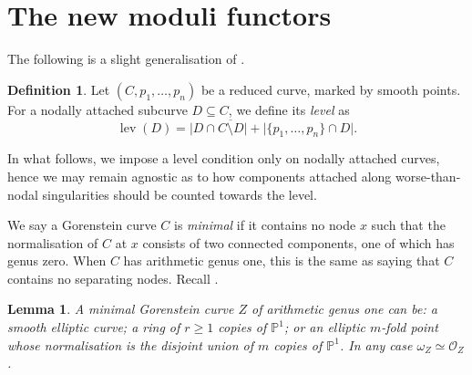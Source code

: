 \documentclass[11pt]{amsart}
\newcommand{\PP}{\mathbb P}
\newcommand{\OO}{\mathcal O}
\newcommand{\lev}{\operatorname{lev}}
\theoremstyle{plain}
\newtheorem{lem}[thm]{Lemma}
\theoremstyle{definition}
\newtheorem{dfn}[thm]{Definition}
\begin{document}
\section{The new moduli functors}\label{sec:stability}
The following is a slight generalisation of \cite[Definition 3.4]{SMY1}.
\begin{dfn}
 Let $(C,p_1,\ldots,p_n)$ be a reduced curve, marked by smooth points. For a nodally attached subcurve $D\subseteq C$, we define its \emph{level} as \[ \lev(D)=\lvert D\cap\overline{C\setminus D}\rvert+\lvert\{p_1,\ldots,p_n\}\cap D\rvert.\]
\end{dfn}
In what follows, we impose a level condition only on nodally attached curves, hence we may remain agnostic as to how components attached along worse-than-nodal singularities should be counted towards the level.

We say a Gorenstein curve $C$ is \emph{minimal} if it contains no node $x$ such that the normalisation of $C$ at $x$ consists of two connected components, one of which has genus zero. When $C$ has arithmetic genus one, this is the same as saying that $C$ contains no separating nodes. Recall \cite[Lemma 3.3]{SMY1}.

\begin{lem}\label{lem:min1}
 A minimal Gorenstein curve $Z$ of arithmetic genus one can be: a smooth elliptic curve; a ring of $r\geq 1$ copies of $\PP^1$; or an elliptic $m$-fold point whose normalisation is the disjoint union of $m$ copies of $\PP^1$. In any case $\omega_Z\simeq\OO_Z$.
\end{lem}
\end{document}
